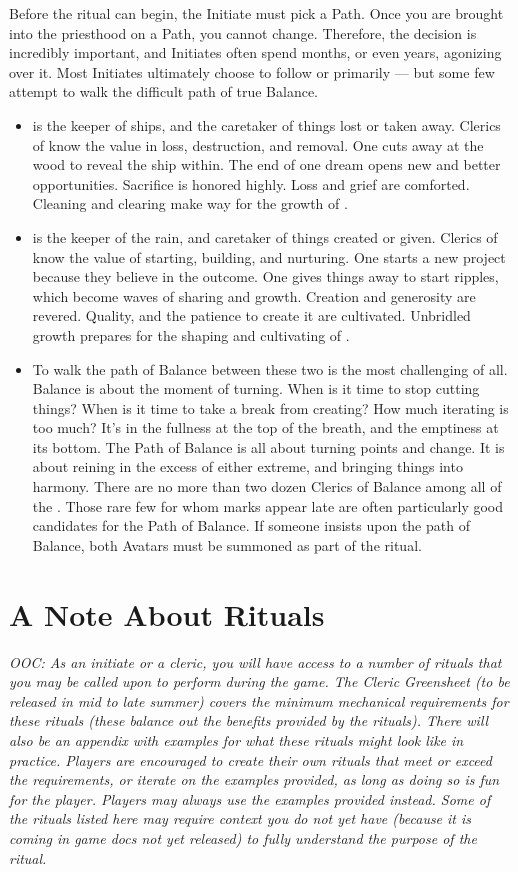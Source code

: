 \documentclass[blue]{GL2020}
\begin{document}
Before the ritual can begin, the Initiate must pick a Path. Once you are brought into the priesthood on a Path, you cannot change. Therefore, the decision is incredibly important, and Initiates often spend months, or even years, agonizing over it. Most Initiates ultimately choose to follow \cEbb{} or \cFlow{} primarily — but some few attempt to walk the difficult path of true Balance.
\begin{itemize}
  \item \cEbbFull{\full} is the keeper of ships, and the caretaker of things lost or taken away. Clerics of \cEbb{} know the value in loss, destruction, and removal. One cuts away at the wood to reveal the ship within. The end of one dream opens new and better opportunities. Sacrifice is honored highly. Loss and grief are comforted. Cleaning and clearing make way for the growth of \cFlow{}.
  \item \cFlowFull{\full} is the keeper of the rain, and caretaker of things created or given. Clerics of \cFlow{} know the value of starting, building, and nurturing. One starts a new project because they believe in the outcome. One gives things away to start ripples, which become waves of sharing and growth. Creation and generosity are revered. Quality, and the patience to create it are cultivated. Unbridled growth prepares for the shaping and cultivating of \cEbb{}.
  \item To walk the path of Balance between these two is the most challenging of all. Balance is about the moment of turning. When is it time to stop cutting things? When is it time to take a break from creating? How much iterating is too much? It's in the fullness at the top of the breath, and the emptiness at its bottom. The Path of Balance is all about turning points and change. It is about reining in the excess of either extreme, and bringing things into harmony. There are no more than two dozen Clerics of Balance among all of the \pShippies{}. Those rare few for whom marks appear late are often particularly good candidates for the Path of Balance. If someone insists upon the path of Balance, both Avatars must be summoned as part of the ritual.
\end{itemize}

\section*{A Note About Rituals}
\emph{OOC: As an initiate or a cleric, you will have access to a number of rituals that you may be called upon to perform during the game. The Cleric Greensheet (to be released in mid to late summer) covers the minimum mechanical requirements for these rituals (these balance out the benefits provided by the rituals). There will also be an appendix with examples for what these rituals might look like in practice. Players are encouraged to create their own rituals that meet or exceed the requirements, or iterate on the examples provided, as long as doing so is fun for the player. Players may always use the examples provided instead. Some of the rituals listed here may require context you do not yet have (because it is coming in game docs not yet released) to fully understand the purpose of the ritual.}
\end{document}

